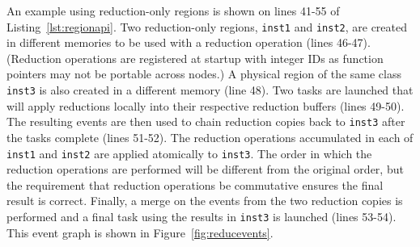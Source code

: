 An example using reduction-only regions is shown on lines 41-55 of Listing~\ref{lst:regionapi}.
Two reduction-only regions, {\tt inst1} and {\tt inst2}, are created in different memories to
be used with a reduction operation (lines 46-47).  (Reduction operations are registered at startup with integer IDs
as function pointers may not be portable across nodes.)  A physical region of the same class {\tt inst3}
is also created in a different memory (line 48).  Two tasks are launched that will apply
reductions locally into their respective reduction buffers (lines 49-50).  The resulting
events are then used to chain reduction copies back to {\tt inst3} after the tasks complete (lines 51-52).
The reduction operations accumulated in each of {\tt inst1} and {\tt inst2} are applied atomically
to {\tt inst3}.  The order in which the reduction operations are performed will be different from
the original order, but the requirement that reduction operations be commutative ensures the final
result is correct.  Finally, a merge on the events from the two reduction copies is 
performed and a final task using the results in {\tt inst3} is launched (lines 53-54).  This event
graph is shown in Figure~\ref{fig:reducevents}.



